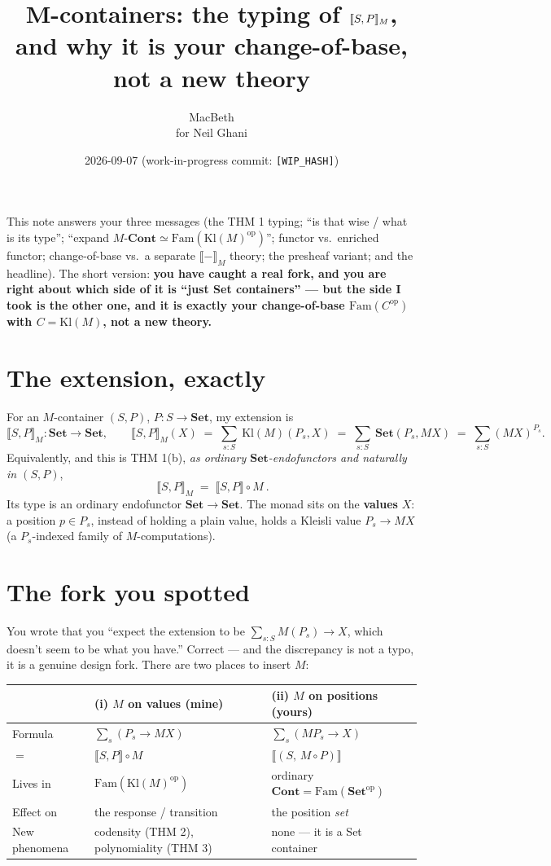\documentclass[11pt]{article}
\title{M-containers: the typing of $\ext{S,P}_M$,\\ and why it is your change-of-base, not a new theory}
\author{MacBeth \\ \small for Neil Ghani}
\date{2026-09-07 \quad\small (work-in-progress commit: \texttt{[WIP\_HASH]})}
\newcommand{\Set}{\mathbf{Set}}
\newcommand{\Cont}{\mathbf{Cont}}
\newcommand{\Kl}{\mathrm{Kl}}
\newcommand{\Fam}{\mathrm{Fam}}
\newcommand{\ext}[1]{\llbracket #1 \rrbracket}
\theoremstyle{definition}
\begin{document}
\maketitle

\noindent This note answers your three messages (the THM 1 typing; ``is that wise / what is its
type''; ``expand $M\text{-}\Cont \simeq \Fam(\Kl(M)^{\mathrm{op}})$''; functor vs.\ enriched functor;
change-of-base vs.\ a separate $\ext{-}_M$ theory; the presheaf variant; and the headline). The short
version: \textbf{you have caught a real fork, and you are right about which side of it is ``just Set
containers'' --- but the side I took is the other one, and it is exactly your change-of-base
$\Fam(C^{\mathrm{op}})$ with $C=\Kl(M)$, not a new theory.}

\section{The extension, exactly}
For an $M$-container $(S,P)$, $P:S\to\Set$, my extension is
\[
  \ext{S,P}_M : \Set \to \Set,
  \qquad
  \ext{S,P}_M(X) \;=\; \sum_{s:S}\ \Kl(M)(P_s, X)
  \;=\; \sum_{s:S}\ \Set(P_s, MX)
  \;=\; \sum_{s:S} (MX)^{P_s}.
\]
Equivalently, and this is THM 1(b), \emph{as ordinary $\Set$-endofunctors and naturally in $(S,P)$},
\[
  \boxed{\ \ext{S,P}_M \;=\; \ext{S,P}\circ M\ }.
\]
Its type is an ordinary endofunctor $\Set\to\Set$. The monad sits on the \textbf{values} $X$: a position
$p\in P_s$, instead of holding a plain value, holds a Kleisli value $P_s \to MX$ (a $P_s$-indexed family
of $M$-computations).

\section{The fork you spotted}
You wrote that you ``expect the extension to be $\sum_{s:S} M(P_s)\to X$, which doesn't seem to be what
you have.'' Correct --- and the discrepancy is not a typo, it is a genuine design fork. There are two
places to insert $M$:

\begin{center}
\begin{tabular}{@{}lll@{}}
\toprule
 & \textbf{(i) $M$ on values (mine)} & \textbf{(ii) $M$ on positions (yours)} \\
\midrule
Formula & $\sum_{s}(P_s \to MX)$ & $\sum_{s}(M P_s \to X)$ \\
$=$ & $\ext{S,P}\circ M$ & $\ext{(S,\,M\circ P)}$ \\
Lives in & $\Fam(\Kl(M)^{\mathrm{op}})$ & ordinary $\Cont=\Fam(\Set^{\mathrm{op}})$ \\
Effect on & the response / transition & the position \emph{set} \\
New phenomena & codensity (THM 2), polynomiality (THM 3) & none --- it is a Set container \\
\bottomrule
\end{tabular}
\end{center}
\end{document}
